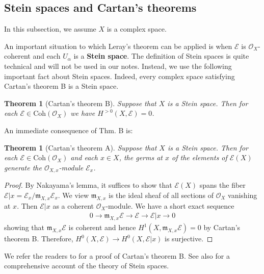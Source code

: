 \documentclass[12pt,b5paper,notitlepage]{report}
\theoremstyle{definition}
\theoremstyle{plain}
\newtheorem{thm}[df]{Theorem}
\newcommand{\fk}{\mathfrak}
\newcommand{\scr}{\mathscr}
\newcommand{\Coh}{\mathrm{Coh}}
\numberwithin{equation}{section}
\begin{document}
\subsection{Stein spaces and Cartan's theorems}

In this subsection, we assume $X$ is a complex space.

An important situation to which Leray's theorem can be applied is when $\scr E$ is $\scr O_X$-coherent and each $U_\alpha$ is a \textbf{Stein space}.  The definition of Stein spaces is quite technical and will not be used in our notes. Instead, we use the following important fact about Stein spaces. Indeed, every complex space satisfying Cartan's theorem B is a Stein space.


\begin{thm}[Cartan's theorem B]\label{lb346} 
Suppose that $X$ is a Stein space. Then for each $\scr E\in\Coh(\scr O_X)$ we have $H^{>0}(X,\scr E)=0$.
\end{thm}




An immediate consequence of Thm. B is:


\begin{thm}[Cartan's theorem A] 
Suppose that $X$ is a Stein space. Then for each $\scr E\in\Coh(\scr O_X)$ and each $x\in X$, the germs at $x$ of the elements of $\scr E(X)$ generate the $\scr O_{X,x}$-module $\scr E_x$.
\end{thm}


\begin{proof}
By Nakayama's lemma, it suffices to show that $\scr E(X)$ spans the fiber $\scr E|x=\scr E_x/\fk m_{X,x}\scr E_x$. We view  $\fk m_{X,x}$ is the ideal sheaf of all sections of $\scr O_X$ vanishing at $x$. Then $\scr E|x$ as a coherent $\scr O_X$-module. We have a short exact sequence
\begin{align*}
0\rightarrow \fk m_{X,x}\scr E\rightarrow\scr E\rightarrow \scr E|x\rightarrow0
\end{align*}
showing that $\fk m_{X,x}\scr E$ is coherent and hence $H^1(X,\fk m_{X,x}\scr E)=0$ by Cartan's theorem B. Therefore, $H^0(X,\scr E)\rightarrow H^0(X,\scr E|x)$ is surjective.
\end{proof}



We refer the readers to \cite[Chapter 10, 11]{Tay} for a proof of Cartan's theorem B. See also \cite{GR-a} for a comprehensive account of the theory of Stein spaces. 
\end{document}

